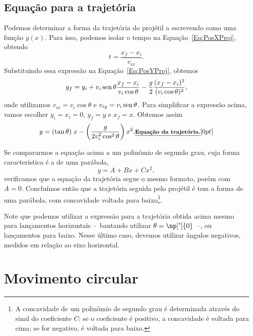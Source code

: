 \subsection{Equação para a trajetória}

Podemos determinar a forma da trajetória do projétil a escrevendo como uma função $y(x)$. Para isso, podemos isolar o tempo na Equação~\eqref{Eq:PosXProj}, obtendo
\begin{equation}
  t = \frac{x_f - x_i}{v_{ix}}.
\end{equation}
%
Substituindo essa expressão na Equação~\eqref{Eq:PosYProj}, obtemos
\begin{equation}
  y_f = y_i + v_i\operatorname{sen}\theta \frac{x_f-x_i}{v_i\cos\theta} - \frac{g}{2}\frac{(x_f-x_i)^2}{(v_i\cos\theta)^2},
\end{equation}
%
onde utilizamos $v_{ix} = v_i\cos\theta$ e $v_{iy} = v_i\operatorname{sen}\theta$. Para simplificar a expressão acima, vamos escolher $y_i = x_i = 0$, $y_f = y$ e $x_f = x$. Obtemos assim
\begin{equation}\label{Eq:EqDaTrajetoria}
  y = (\tan\theta) \; x - \left(\frac{g}{2v_i^2\cos^2\theta}\right) x^2. \relax{\footnotesize\emph{\textbf{Equação da trajetória.}}}[0pt]
\end{equation}

Se compararmos a equação acima a um polinômio de segundo grau, cuja forma característica é a de uma parábola, 
\begin{equation}
  y = A + B x + C x^2,
\end{equation}
%
verificamos que a equação da trajetória segue o mesmo formato, porém com $A = 0$. Concluímos então que a trajetória seguida pelo projétil é tem a forma de uma parábola, com concavidade voltada para baixo\footnote{A concavidade de um polinômio de segundo grau é determinada através do sinal do coeficiente $C$: se o coeficiente é positivo, a concavidade é voltada para cima; se for negativo, é voltada para baixo.}.

Note que podemos utilizar a expressão para a trajetória obtida acima mesmo para lançamentos horizontais --~bantando utilizar $\theta = \np[\tcdegree]{0}$~--, ou lançamentos para baixo. Nesse último caso, devemos utilizar ângulos negativos, medidos em relação ao eixo horizontal.

\section{Movimento circular}
